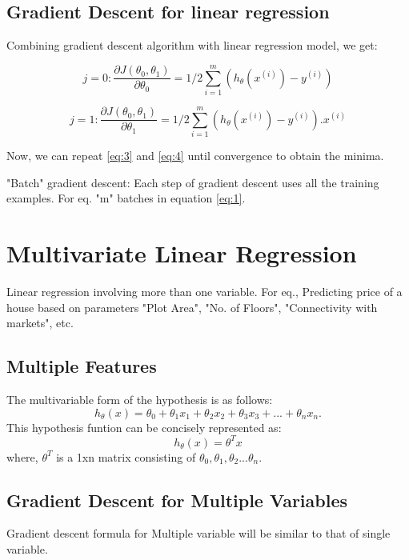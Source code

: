 \documentclass[12pt]{report}
\begin{document}
  \subsection{Gradient Descent for linear regression}
    Combining gradient descent algorithm with linear regression model, we get:

    \begin{equation} \label {eq:3}
      j = 0 : \frac{\partial {J(\theta_0, \theta_1)}}{\partial \theta_0} = 1/2 \sum_{i=1}^{m} (h_\theta(x^{(i)})-y^{(i)}) 
    \end{equation}

    \begin{equation} \label {eq:4}
      j = 1 : \frac{\partial {J(\theta_0, \theta_1)}}{\partial \theta_1} = 1/2 \sum_{i=1}^{m} (h_\theta(x^{(i)})-y^{(i)}).x^{(i)}
    \end{equation}

    Now, we can repeat \ref{eq:3} and \ref{eq:4} until convergence to obtain the minima.

    "Batch" gradient descent: Each step of gradient descent uses all the training examples.
    For eq. "m" batches in equation \ref{eq:1}.

\section{Multivariate Linear Regression}
  Linear regression involving more than one variable. For eq., Predicting price of a house based on parameters "Plot Area", "No. of Floors", "Connectivity with markets", etc.

  \subsection{Multiple Features}
    The multivariable form of the hypothesis is as follows:
    \begin{equation} \label {eq:5}
      h_\theta(x) = \theta_0 + \theta_1x_1 + \theta_2x_2 + \theta_ 3x_3 + ... + \theta_{n}x_n.  
    \end{equation}
    This hypothesis funtion can be concisely represented as:
    \begin{equation}
      h_\theta(x) = \theta^{T}x
    \end{equation}
    where, $ \theta^T $ is a 1xn matrix consisting of $ \theta_0, \theta_1, \theta_2 ... \theta_n $.


  \subsection{Gradient Descent for Multiple Variables}
    Gradient descent formula for Multiple variable will be similar to that of single variable.
\end{document}
